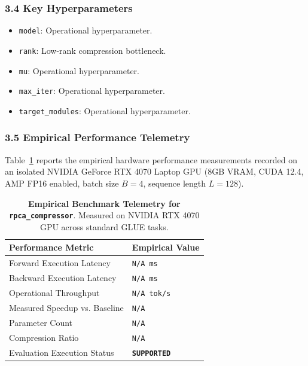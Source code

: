 \subsubsection*{3.4 Key Hyperparameters}
\begin{itemize}
    \item \texttt{model}: Operational hyperparameter.
    \item \texttt{rank}: Low-rank compression bottleneck.
    \item \texttt{mu}: Operational hyperparameter.
    \item \texttt{max\_iter}: Operational hyperparameter.
    \item \texttt{target\_modules}: Operational hyperparameter.
\end{itemize}

\subsubsection*{3.5 Empirical Performance Telemetry}
Table~\ref{tab:telemetry_rpca\_compressor} reports the empirical hardware performance measurements recorded on an isolated NVIDIA GeForce RTX 4070 Laptop GPU (8GB VRAM, CUDA 12.4, AMP FP16 enabled, batch size $B=4$, sequence length $L=128$).

\begin{table}[h]
\centering
\small
\caption{\textbf{Empirical Benchmark Telemetry for \texttt{rpca\_compressor}}. Measured on NVIDIA RTX 4070 GPU across standard GLUE tasks.}
\label{tab:telemetry_rpca\_compressor}
\begin{tabularx}{\columnwidth}{lX}
\toprule
\textbf{Performance Metric} & \textbf{Empirical Value} \\
\midrule
Forward Execution Latency & \texttt{N/A ms} \\
Backward Execution Latency & \texttt{N/A ms} \\
Operational Throughput & \texttt{N/A tok/s} \\
Measured Speedup vs. Baseline & \texttt{N/A} \\
Parameter Count & \texttt{N/A} \\
Compression Ratio & \texttt{N/A} \\
Evaluation Execution Status & \textbf{\texttt{SUPPORTED}} \\
\bottomrule
\end{tabularx}
\end{table}

